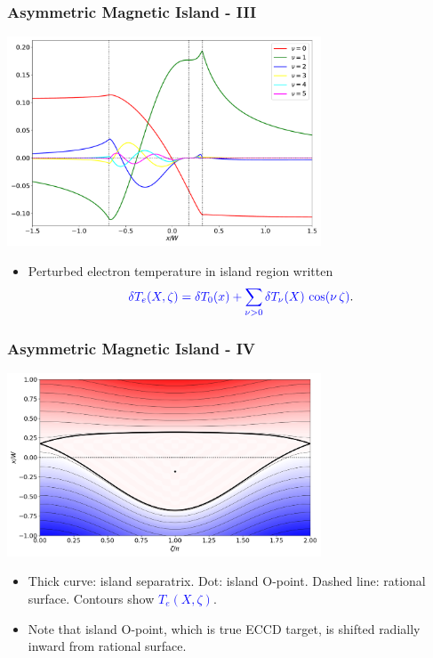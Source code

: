\documentclass{beamer}
\begin{document}
\begin{frame}
\frametitle{Asymmetric Magnetic Island - III}
 
\begin{center}
\includegraphics[width=0.7\textwidth]{../Fig6.pdf}
\end{center} 

\begin{itemize}
\item Perturbed electron temperature in island region written
$$
\textcolor{blue}{\delta T_e(X,\zeta) = \delta T_0(x)+\sum_{\nu>0} \delta T_\nu(X)\,\cos(\nu\,\zeta)}.
$$
\end{itemize}
\end{frame}


\begin{frame}
\frametitle{Asymmetric Magnetic Island - IV}
 
\begin{center}
\includegraphics[width=0.7\textwidth]{../Fig7.png}
\end{center}
\begin{itemize}
\item Thick curve: island separatrix. Dot: island O-point. Dashed line: 
rational surface. Contours show \textcolor{blue}{$T_e(X,\zeta)$}.
\item Note that island O-point, which is true ECCD target, is shifted radially inward from rational surface. 
\end{itemize}
\end{frame}
\end{document}
